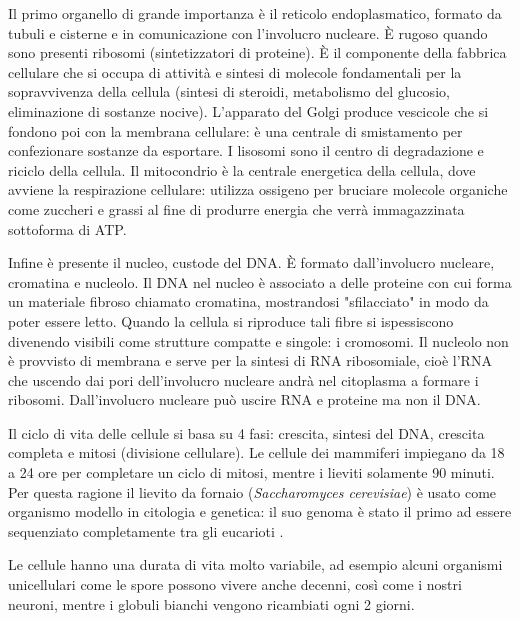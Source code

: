 \par Il primo organello di grande importanza è il reticolo endoplasmatico, formato da tubuli e cisterne e in comunicazione con l'involucro nucleare. È rugoso quando sono presenti ribosomi (sintetizzatori di proteine). È il componente della fabbrica cellulare che si occupa di attività e sintesi di molecole fondamentali per la sopravvivenza della cellula (sintesi di steroidi, metabolismo del glucosio, eliminazione di sostanze nocive). L'apparato del Golgi produce vescicole che si fondono poi con la membrana cellulare: è una centrale di smistamento per confezionare sostanze da esportare. I lisosomi sono il centro di degradazione e riciclo della cellula. Il mitocondrio è la centrale energetica della cellula, dove avviene la respirazione cellulare: utilizza ossigeno per bruciare molecole organiche come zuccheri e grassi al fine di produrre energia che verrà immagazzinata sottoforma di ATP. 

\par Infine è presente il nucleo, custode del DNA. È formato dall'involucro nucleare, cromatina e nucleolo. Il DNA nel nucleo è associato a delle proteine con cui forma un materiale fibroso chiamato cromatina, mostrandosi "sfilacciato" in modo da poter essere letto. Quando la cellula si riproduce tali fibre si ispessiscono divenendo visibili come strutture compatte e singole: i cromosomi. Il nucleolo non è provvisto di membrana e serve per la sintesi di RNA ribosomiale, cioè l'RNA che uscendo dai pori dell'involucro nucleare andrà nel citoplasma a formare i ribosomi. Dall'involucro nucleare può uscire RNA e proteine ma non il DNA. \\

\par Il ciclo di vita delle cellule si basa su 4 fasi: crescita, sintesi del DNA, crescita completa e mitosi (divisione cellulare). Le cellule dei mammiferi impiegano da 18 a 24 ore per completare un ciclo di mitosi, mentre i lieviti solamente 90 minuti. Per questa ragione il lievito da fornaio (\textit{Saccharomyces cerevisiae}) è usato come organismo modello in citologia e genetica: il suo genoma è stato il primo ad essere sequenziato completamente tra gli eucarioti \supercite{lievitoWiki}. 

\par Le cellule hanno una durata di vita molto variabile, ad esempio alcuni organismi unicellulari come le spore possono vivere anche decenni, così come i nostri neuroni, mentre i globuli bianchi vengono ricambiati ogni 2 giorni. \\

